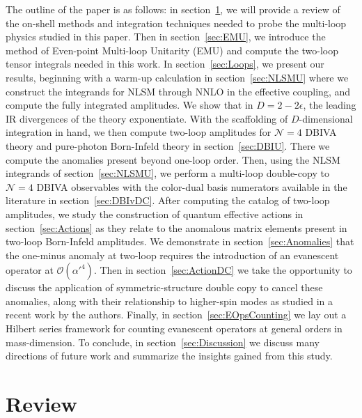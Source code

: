 \documentclass[12pt,letter]{article}
\def\sect#1{section~\ref{#1}}
\begin{document}
The outline of the paper is as follows: in \sect{sec:Review}, we will provide a review of the on-shell methods and integration techniques needed to probe the multi-loop physics studied in this paper. Then in \sect{sec:EMU}, we introduce the method of Even-point Multi-loop Unitarity (EMU) and compute the two-loop tensor integrals needed in this work. In \sect{sec:Loops}, we present our results, beginning with a warm-up calculation in \sect{sec:NLSMU} where we construct the integrands for NLSM through NNLO in the effective coupling, and compute the fully integrated amplitudes. We show that in $D=2-2\epsilon$, the leading IR divergences of the theory exponentiate. With the scaffolding of $D$-dimensional integration in hand, we then compute two-loop amplitudes for $\mathcal{N}=4$ DBIVA theory and pure-photon Born-Infeld theory in \sect{sec:DBIU}. There we compute the anomalies present beyond one-loop order.  Then, using the NLSM integrands of \sect{sec:NLSMU}, we perform a multi-loop double-copy to $\mathcal{N}=4$ DBIVA observables with the color-dual basis numerators available in the literature in \sect{sec:DBIvDC}. After computing the catalog of two-loop amplitudes, we study the construction of quantum effective actions in \sect{sec:Actions} as they relate to the anomalous matrix elements present in two-loop Born-Infeld amplitudes. We demonstrate in \sect{sec:Anomalies} that the one-minus anomaly at two-loop requires the introduction of an evanescent operator at $\mathcal{O}(\alpha'^4)$. Then in \sect{sec:ActionDC} we take the opportunity to discuss the application of symmetric-structure double copy to cancel these anomalies, along with their relationship to higher-spin modes as studied in a recent work by the authors. Finally, in \sect{sec:EOpsCounting} we lay out a Hilbert series framework for counting evanescent operators at general orders in mass-dimension. To conclude, in \sect{sec:Discussion} we discuss many directions of future work and summarize the insights gained from this study. 


\section{Review} 
\label{sec:Review}
\end{document}
